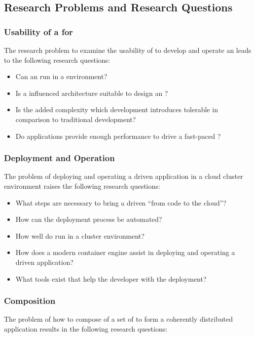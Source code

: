 \subsection{Research Problems and Research Questions}
\label{sub:problems}

\subsubsection{Usability of a \ms{} for \ogs{}} 

The research problem to examine the usability of \mss{} to develop and operate
an \og{} leads to the following research questions:

\begin{itemize}
  \item Can an \og{} run in a \ms{} environment?
  \item Is a \ms{} influenced architecture suitable to design an \og{}?
  \item Is the added complexity which \ms{} development introduces tolerable
  in comparison to traditional \og{} development?
  \item Do \ms{} applications provide enough performance to drive a fast-paced
  \og{}?
\end{itemize}

\subsubsection{Deployment and Operation}

The problem of deploying and operating a \ms{} driven \og{} application in a cloud
cluster environment raises the following research questions:

\begin{itemize}
  \item What steps are necessary to bring a \ms{} driven \og{} ``from code to
  the cloud''?
  \item How can the deployment process be automated?
  \item How well do \ogs{} run in a cluster environment?
  \item How does a modern container engine assist in deploying and operating a
  \ms{} driven application?
  \item What tools exist that help the developer with the deployment?
\end{itemize}

\subsubsection{\ms{} Composition}
The problem of how to compose of a set of \mss{} to form a coherently
distributed application results in the following research questions:

